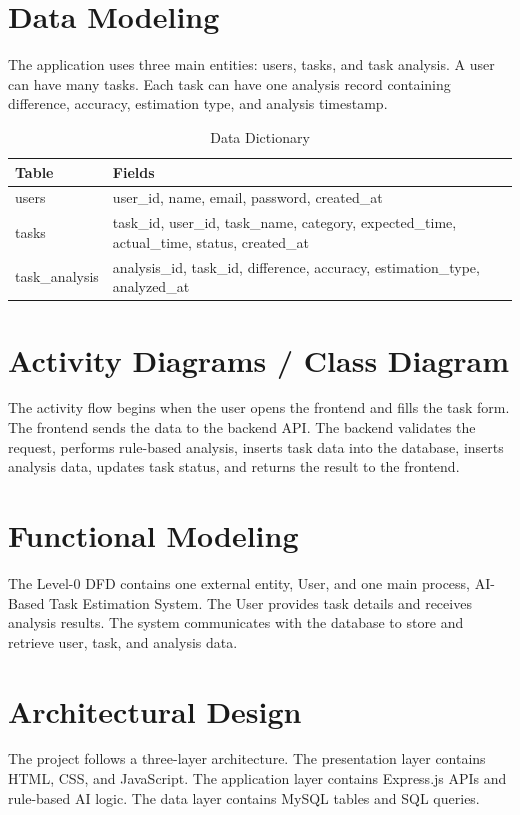 \section{Data Modeling}
\begin{justify}
The application uses three main entities: users, tasks, and task analysis. A user can have many tasks. Each task can have one analysis record containing difference, accuracy, estimation type, and analysis timestamp.
\end{justify}

\begin{table}[H]
\centering
\begin{tabular}{|M|L|}
\hline
\textbf{Table} & \textbf{Fields} \\
\hline
users & user\_id, name, email, password, created\_at \\
\hline
tasks & task\_id, user\_id, task\_name, category, expected\_time, actual\_time, status, created\_at \\
\hline
task\_analysis & analysis\_id, task\_id, difference, accuracy, estimation\_type, analyzed\_at \\
\hline
\end{tabular}
\caption{Data Dictionary}
\end{table}

\section{Activity Diagrams / Class Diagram}
\begin{justify}
The activity flow begins when the user opens the frontend and fills the task form. The frontend sends the data to the backend API. The backend validates the request, performs rule-based analysis, inserts task data into the database, inserts analysis data, updates task status, and returns the result to the frontend.
\end{justify}

\section{Functional Modeling}
\begin{justify}
The Level-0 DFD contains one external entity, User, and one main process, AI-Based Task Estimation System. The User provides task details and receives analysis results. The system communicates with the database to store and retrieve user, task, and analysis data.
\end{justify}

\section{Architectural Design}
\begin{justify}
The project follows a three-layer architecture. The presentation layer contains HTML, CSS, and JavaScript. The application layer contains Express.js APIs and rule-based AI logic. The data layer contains MySQL tables and SQL queries.
\end{justify}
